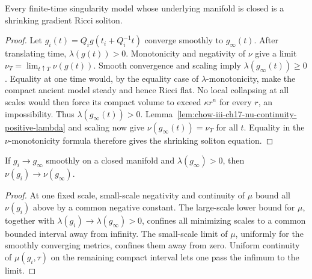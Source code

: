 \begin{theorem}
\label{thm:chow-iii-ch17-compact-model-shrinker}
Every finite-time singularity model whose underlying manifold is closed is a
shrinking gradient Ricci soliton.
\end{theorem}
\begin{proof}
\sketch Let $g_i(t)=Q_i g(t_i+Q_i^{-1}t)$ converge smoothly to $g_\infty(t)$.
After translating time, $\lambda(g(t))>0$.  Monotonicity and negativity of
$\nu$ give a limit $\nu_T=\lim_{t\uparrow T}\nu(g(t))$.
Smooth convergence and scaling imply $\lambda(g_\infty(t))\ge0$.  Equality
at one time would, by the equality case of $\lambda$-monotonicity, make the
compact ancient model steady and hence Ricci flat.  No local collapsing at
all scales would then force its compact volume to exceed $\kappa r^n$ for
every $r$, an impossibility.  Thus $\lambda(g_\infty(t))>0$.
Lemma~\ref{lem:chow-iii-ch17-nu-continuity-positive-lambda} and scaling now
give $\nu(g_\infty(t))=\nu_T$ for all $t$.  Equality in the
$\nu$-monotonicity formula therefore gives the shrinking soliton equation.
\end{proof}

\begin{lemma}
\label{lem:chow-iii-ch17-nu-continuity-positive-lambda}
If $g_i\to g_\infty$ smoothly on a closed manifold and
$\lambda(g_\infty)>0$, then $\nu(g_i)\to\nu(g_\infty)$.
\end{lemma}
\begin{proof}
\sketch At one fixed scale, small-scale negativity and continuity of $\mu$ bound all
$\nu(g_i)$ above by a common negative constant.  The large-scale lower bound
for $\mu$, together with $\lambda(g_i)\to\lambda(g_\infty)>0$, confines all
minimizing scales to a common bounded interval away from infinity.  The
small-scale limit of $\mu$, uniformly for the smoothly converging metrics,
confines them away from zero.  Uniform continuity of $\mu(g_i,\tau)$ on the
remaining compact interval lets one pass the infimum to the limit.
\end{proof}

